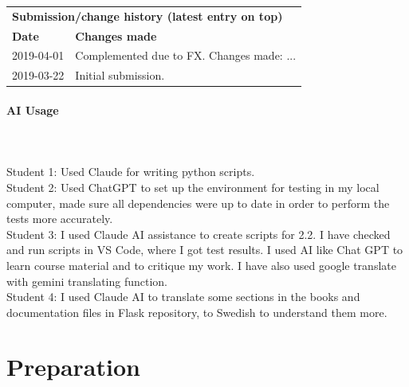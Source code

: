 \documentclass[12pt,a4paper]{article}
\begin{document}
\begin{small}
\begin{longtable}{|l|p{13.3cm}|}
\hline
\multicolumn{2}{|l|}{\textbf{Submission/change history (latest entry on top)}} \\
\textbf{Date} & \textbf{Changes made} \\
\hline
2019-04-01 & Complemented due to FX. Changes made: ... \\
\hline 
2019-03-22 & Initial submission. \\
\hline 
\end{longtable}
\end{small}

\setcounter{table}{0}  %


\newpage

\paragraph{AI Usage} \mbox{} \\
\\
Student 1: Used Claude for writing python scripts.\newline 
\\
Student 2: Used ChatGPT to set up the environment for testing in my local computer, made sure all dependencies were up to date in order to perform the tests more accurately.\newline 
\\
Student 3: I used Claude AI assistance to create scripts for 2.2. I have checked and run scripts in VS Code, where I got test results. I used AI like Chat GPT to learn course material and to critique my work. I have also used google translate with gemini translating function. \newline
\\
Student 4: I used Claude AI to translate some sections in the books and documentation files in Flask repository, to Swedish to understand them more. 

\section{Preparation}
\label{sec:intro}
\end{document}
